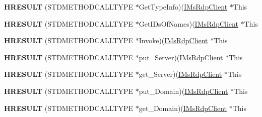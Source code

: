 \begin{DoxyCompactItemize}
{\bfseries H\+R\+E\+S\+U\+LT} (S\+T\+D\+M\+E\+T\+H\+O\+D\+C\+A\+L\+L\+T\+Y\+PE $\ast$Get\+Type\+Info)(\hyperlink{interface_m_s_t_s_c_lib_1_1_i_ms_rdp_client}{I\+Ms\+Rdp\+Client} $\ast$This
\item 
\mbox{\label{struct_m_s_t_s_c_lib_1_1_i_ms_rdp_client_vtbl_ab2336d923a99bf3d32b3457189fba95b}} 
{\bfseries H\+R\+E\+S\+U\+LT} (S\+T\+D\+M\+E\+T\+H\+O\+D\+C\+A\+L\+L\+T\+Y\+PE $\ast$Get\+I\+Ds\+Of\+Names)(\hyperlink{interface_m_s_t_s_c_lib_1_1_i_ms_rdp_client}{I\+Ms\+Rdp\+Client} $\ast$This
\item 
\mbox{\label{struct_m_s_t_s_c_lib_1_1_i_ms_rdp_client_vtbl_a8eeeb9f9086be119ab3e9e6d17bfb235}} 
{\bfseries H\+R\+E\+S\+U\+LT} (S\+T\+D\+M\+E\+T\+H\+O\+D\+C\+A\+L\+L\+T\+Y\+PE $\ast$Invoke)(\hyperlink{interface_m_s_t_s_c_lib_1_1_i_ms_rdp_client}{I\+Ms\+Rdp\+Client} $\ast$This
\item 
\mbox{\label{struct_m_s_t_s_c_lib_1_1_i_ms_rdp_client_vtbl_a42345da484b6d8793b5466755ded398a}} 
{\bfseries H\+R\+E\+S\+U\+LT} (S\+T\+D\+M\+E\+T\+H\+O\+D\+C\+A\+L\+L\+T\+Y\+PE $\ast$put\+\_\+\+Server)(\hyperlink{interface_m_s_t_s_c_lib_1_1_i_ms_rdp_client}{I\+Ms\+Rdp\+Client} $\ast$This
\item 
\mbox{\label{struct_m_s_t_s_c_lib_1_1_i_ms_rdp_client_vtbl_a88c226453f002aacf66ca3cc8453071a}} 
{\bfseries H\+R\+E\+S\+U\+LT} (S\+T\+D\+M\+E\+T\+H\+O\+D\+C\+A\+L\+L\+T\+Y\+PE $\ast$get\+\_\+\+Server)(\hyperlink{interface_m_s_t_s_c_lib_1_1_i_ms_rdp_client}{I\+Ms\+Rdp\+Client} $\ast$This
\item 
\mbox{\label{struct_m_s_t_s_c_lib_1_1_i_ms_rdp_client_vtbl_a36cd26e9293fd30693847775a9442815}} 
{\bfseries H\+R\+E\+S\+U\+LT} (S\+T\+D\+M\+E\+T\+H\+O\+D\+C\+A\+L\+L\+T\+Y\+PE $\ast$put\+\_\+\+Domain)(\hyperlink{interface_m_s_t_s_c_lib_1_1_i_ms_rdp_client}{I\+Ms\+Rdp\+Client} $\ast$This
\item 
\mbox{\label{struct_m_s_t_s_c_lib_1_1_i_ms_rdp_client_vtbl_aa811592167d203aa1cfcebc5928edabf}} 
{\bfseries H\+R\+E\+S\+U\+LT} (S\+T\+D\+M\+E\+T\+H\+O\+D\+C\+A\+L\+L\+T\+Y\+PE $\ast$get\+\_\+\+Domain)(\hyperlink{interface_m_s_t_s_c_lib_1_1_i_ms_rdp_client}{I\+Ms\+Rdp\+Client} $\ast$This

\end{DoxyCompactItemize}
